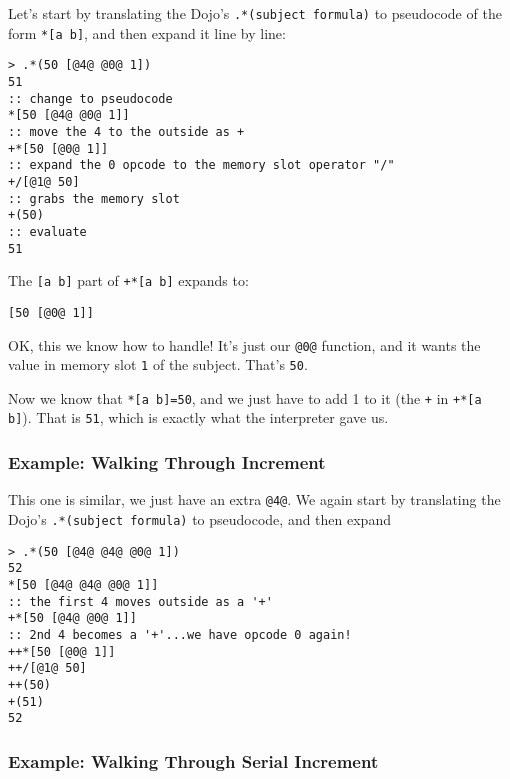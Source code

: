\documentclass[twoside]{article}
\begin{document}
Let's start by translating the Dojo's \lstinline[style=inlinecode]{.*(subject formula)} to pseudocode of the form \lstinline[style=inlinecode]{*[a b]}, and then expand it line by line:

\begin{lstlisting}[style=listingcode]
> .*(50 [@4@ @0@ 1])
51
:: change to pseudocode
*[50 [@4@ @0@ 1]]
:: move the 4 to the outside as +
+*[50 [@0@ 1]]
:: expand the 0 opcode to the memory slot operator "/"
+/[@1@ 50]
:: grabs the memory slot
+(50)
:: evaluate
51
\end{lstlisting}

\noindent
The \lstinline[style=inlinecode]{[a b]} part of \lstinline[style=inlinecode]{+*[a b]} expands to:

\begin{lstlisting}[style=listingcode]
[50 [@0@ 1]]
\end{lstlisting}

\noindent
OK, this we know how to handle! It's just our \lstinline[style=inlinecode]{@0@} function, and it wants the value in memory slot \lstinline[style=inlinecode]{1} of the subject. That's \lstinline[style=inlinecode]{50}.

Now we know that \lstinline[style=inlinecode]{*[a b]=50}, and we just have to add 1 to it (the \lstinline[style=inlinecode]{+} in \lstinline[style=inlinecode]{+*[a b]}). That is \lstinline[style=inlinecode]{51}, which is exactly what the interpreter gave us.

\subsubsection{Example:  Walking Through Increment}

This one is similar, we just have an extra \lstinline[style=inlinecode]{@4@}. We again start by translating the Dojo's \lstinline[style=inlinecode]{.*(subject formula)} to pseudocode, and then expand

\begin{lstlisting}[style=listingcode]
> .*(50 [@4@ @4@ @0@ 1])
52
*[50 [@4@ @4@ @0@ 1]]
:: the first 4 moves outside as a '+'
+*[50 [@4@ @0@ 1]]
:: 2nd 4 becomes a '+'...we have opcode 0 again!
++*[50 [@0@ 1]]
++/[@1@ 50]
++(50)
+(51)
52
\end{lstlisting}

\subsubsection{Example:  Walking Through Serial Increment}
\end{document}
